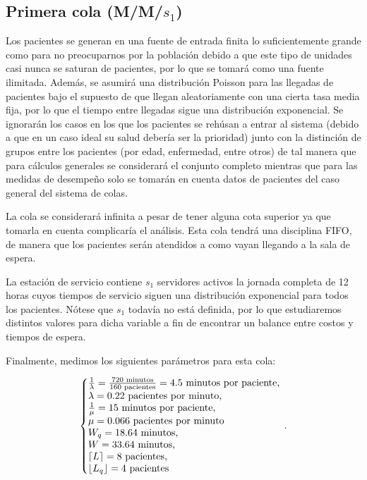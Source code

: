 \documentclass[10pt]{article}
\begin{document}
    \subsection{Primera cola (M/M/$s_{1}$)}
    Los pacientes se generan en una fuente de entrada finita lo suficientemente grande como para no preocuparnos por la población debido a que este tipo de unidades casi nunca se saturan de pacientes, por lo que se tomará como una fuente ilimitada. Además, se asumirá una distribución Poisson para las llegadas de pacientes bajo el supuesto de que llegan aleatoriamente con una cierta tasa media fija, por lo que el tiempo entre llegadas sigue una distribución exponencial. Se ignorarán los casos en los que los pacientes se rehúsan a entrar al sistema (debido a que en un caso ideal su salud debería ser la prioridad) junto con la distinción de grupos entre los pacientes (por edad, enfermedad, entre otros) de tal manera que para cálculos generales se considerará el conjunto completo mientras que para las medidas de desempeño solo se tomarán en cuenta datos de pacientes del caso general del sistema de colas.
    
    La cola se considerará infinita a pesar de tener alguna cota superior ya que tomarla en cuenta complicaría el análisis. Esta cola tendrá una disciplina FIFO, de manera que los pacientes serán atendidos a como vayan llegando a la sala de espera.
    
    La estación de servicio contiene $s_{1}$ servidores activos la jornada completa de 12 horas cuyos tiempos de servicio siguen una distribución exponencial para todos los pacientes. Nótese que $s_{1}$ todavía no está definida, por lo que estudiaremos distintos valores para dicha variable a fin de encontrar un balance entre costos y tiempos de espera.
    
    Finalmente, medimos los siguientes parámetros para esta cola:
    
    \begin{equation*}
    	\left\{
    		\begin{array}{@{}l@{}}
	    		\frac{1}{\lambda} = \frac{720 \text{ minutos}}{160 \text{ pacientes}} = 4.5 \text{ minutos por paciente,} \\
	    		\lambda = 0.22 \text{ pacientes por minuto,} \\
	    		\frac{1}{\mu} = 15 \text{ minutos por paciente,} \\
	    		\mu = 0.066 \text{ pacientes por minuto} \\
	    		W_{q} = 18.64 \text{ minutos,} \\
	    		W = 33.64 \text{ minutos,} \\
	    		\left\lceil L \right\rceil = 8 \text{ pacientes,} \\
	    		\left\lfloor L_{q} \right\rfloor = 4 \text{ pacientes}
    		\end{array}
   		\right.\,.
    \end{equation*}
    
\end{document}
